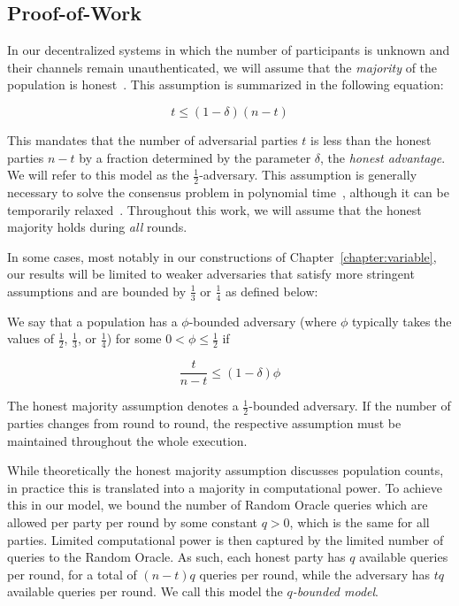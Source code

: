 \subsection{Proof-of-Work}
In our decentralized systems in which the number of participants is unknown and
their channels remain unauthenticated, we will assume that the \emph{majority}
of the population is honest~\cite{backbone}. This assumption is summarized in
the following equation:

\[
t \leq (1 - \delta)(n - t)
\]

This mandates that the number of adversarial parties $t$ is less than the honest
parties $n - t$ by a fraction determined by the parameter $\delta$, the
\emph{honest advantage}. We will refer to
this model as the $\frac{1}{2}$-adversary. This assumption is generally
necessary to solve the consensus problem in polynomial time~\cite{okun},
although it can be temporarily relaxed~\cite{dishonest}. Throughout this
work, we will assume that the honest majority holds during \emph{all} rounds.

In some cases, most notably in our constructions of
Chapter~\ref{chapter:variable}, our results will be limited to weaker
adversaries that satisfy more stringent assumptions and are bounded by
$\frac{1}{3}$ or $\frac{1}{4}$ as defined below:

\begin{definition}
  We say that a population has a $\phi$-bounded adversary (where $\phi$
  typically takes the values of $\frac{1}{2}$, $\frac{1}{3}$, or $\frac{1}{4}$)
  for some $0 < \phi \leq \frac{1}{2}$ if

  \[
  \frac{t}{n - t} \leq (1 - \delta)\phi
  \]
\end{definition}

The honest majority assumption denotes a $\frac{1}{2}$-bounded adversary. If the
number of parties changes from round to round, the respective assumption must be
maintained throughout the whole execution.

While theoretically the honest majority assumption discusses population counts,
in practice this is translated into a majority in computational power. To
achieve this in our model, we bound the number of Random Oracle queries which
are allowed per party per round by some constant $q > 0$, which is the same for all
parties. Limited computational power is then captured by the limited number of
queries to the Random Oracle. As such, each honest party has $q$ available
queries per round, for a total of $(n - t)q$ queries per round, while the
adversary has $tq$ available queries per round. We call this model the
\emph{$q$-bounded model}.

